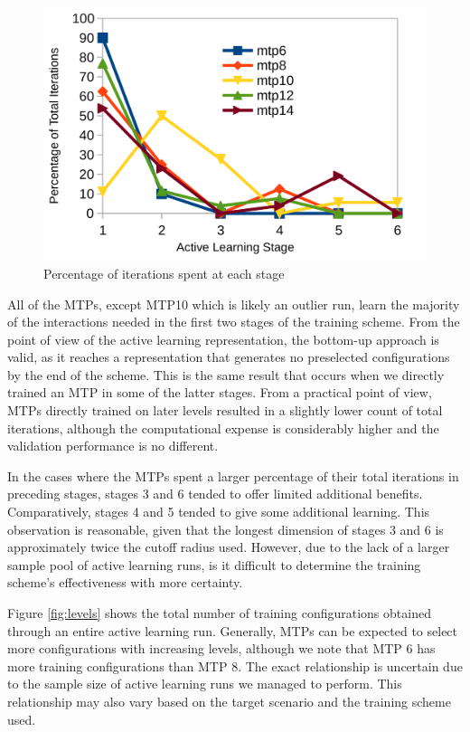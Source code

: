 \documentclass[9pt,twocolumn,twoside]{opticajnl}
\begin{document}
\begin{figure}[ht]
  \centering
  \includegraphics[width=\linewidth]{assets/iterations.png}
  \caption{Percentage of iterations spent at each stage}
  \label{fig:iterations}
\end{figure}

All of the MTPs, except MTP10 which is likely an outlier run, learn the majority of the interactions needed in the first two stages of the training scheme. From the point of view of the active learning representation, the bottom-up approach is valid, as it reaches a representation that generates no preselected configurations by the end of the scheme. This is the same result that occurs when we directly trained an MTP in some of the latter stages. From a practical point of view, MTPs directly trained on later levels resulted in a slightly lower count of total iterations, although the computational expense is considerably higher and the validation performance is no different. 

In the cases where the MTPs spent a larger percentage of their total iterations in preceding stages, stages 3 and 6 tended to offer limited additional benefits. Comparatively, stages 4 and 5 tended to give some additional learning. This observation is reasonable, given that the longest dimension of stages 3 and 6 is approximately twice the cutoff radius used. However, due to the lack of a larger sample pool of active learning runs, is it difficult to determine the training scheme's effectiveness with more certainty. 

Figure \ref{fig:levels} shows the total number of training configurations obtained through an entire active learning run. Generally, MTPs can be expected to select more configurations with increasing levels, although we note that MTP 6 has more training configurations than MTP 8. The exact relationship is uncertain due to the sample size of active learning runs we managed to perform. This relationship may also vary based on the target scenario and the training scheme used. 
\end{document}
